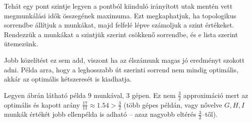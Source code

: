 Tehát egy pont szintje legyen a pontból kiinduló irányított utak  mentén vett
megmunkálási idők összegének maximuma. Ezt megkaphatjuk, ha topologikus
sorrendbe állítjuk a munkákat, majd felfelé lépve számoljuk a szint értékeket.
Rendezzük a munkákat a szintjük szerint csökkenő sorrendbe, és e lista szerint
ütemezünk. 

Jobb közelítést ez sem add, viszont ha az élszámunk magas jó eredményt szokott
adni. Példa arra, hogy a leghosszabb út szerinti sorrend nem mindig optimális,
akkár az optimális kétszeresét is kiadhatja.

Legyen  ábrán látható példa $9$ munkával, $3$ gépen. Ez nem
$\frac{3}{2}$ approximáció mert az optimális és kapott arány $\frac{17}{11}
\approx 1.54 > \frac{3}{2}$ (több gépes példán, vagy nővelve $G,H,I$ munkák
értékét jobb ellenpélda is adható -- azaz nagyobb eltérés $\frac{3}{2}$--től).

